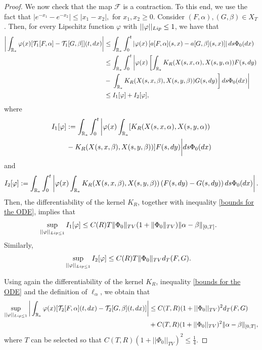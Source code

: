 \documentclass[11pt]{article}
\numberwithin{equation}{section}
\theoremstyle{plain}
\newcommand{\der}{\textup{d}}
\begin{document}
\begin{proof}
We now check that the map $\mathcal F$ is a contraction. 
To this end, we use the fact that $|e^{-x_{1}}-e^{-x_{2}}|\leq|x_{1}-x_{2}|,$ for $x_{1},x_{2}\geq 0.$
Consider $(F,\alpha), (G,\beta) \in X_{T}$. 
Then, for every Lipschitz function $\varphi$ with $||\varphi||_{\textup{Lip}}\leq 1$, we have that
\begin{align*}
\bigg|\int_{\mathbb R_*} \varphi(x) [\mathcal T_1 [F,\alpha ]-\mathcal T_{1}[G,\beta]](t,\der x)\bigg|&\leq \int_{\mathbb R_*} \int_0^t \left| \varphi(x)  \left[a[F,\alpha](s,x)- a[G,\beta ](s,x) \right] \right| \der s \Phi_0(\der x) \\
&\leq \int_{\mathbb R_*} \int_0^t \left| \varphi(x)  \left[ \int_{\mathbb R_*}  K_R(X(s,x,\alpha),X(s,y,\alpha)) F(s, \der y)  \right. \right. \\
& -\left.\left.  \int_{\mathbb R_*}  K_R(X(s,x,\beta),X(s,y,\beta )) G(s, \der y) \right] \der s \Phi_0(\der x)  \right|\\
&\leq I_1[\varphi] + I_2[\varphi],
\end{align*}
where 
\begin{align*}
I_1[\varphi] &:=\int_{\mathbb R_*} \int_0^t \bigg| \varphi(x) \int_{\mathbb R_*} [ K_R(X(s,x,\alpha),X(s,y,\alpha))  \\
&  - K_R(X(s,x,\beta),X(s,y,\beta )) ]  F(s, \der y) \bigg| \der s \Phi_0(\der x)
\end{align*} 
and
\begin{align*} 
I_2[\varphi]:=  \int_{\mathbb R_*} \int_0^t \left| \varphi(x)  \int_{\mathbb R_*}  K_R(X(s,x,\beta),X(s,y,\beta )) \left( F(s, \der y) - G(s, \der y) \right) \der s \Phi_0(\der x ) \right|.
\end{align*} 
Then, the differentiability of the kernel $K_R$, together with inequality \eqref{bounds for the ODE}, implies that 
\begin{align*} 
&\sup_{||\varphi||_{\textup{Lip}\leq 1}} I_1[\varphi] \leq C(R) T \|\Phi_0\|_{TV} (1+ \|\Phi_0\|_{TV}) \|\alpha-\beta\|_{[0,T]}. 
\end{align*} 
Similarly, 
\begin{align*} 
&\sup_{||\varphi||_{\textup{Lip}\leq 1}} I_2[\varphi] \leq C(R) T \|\Phi_0\|_{TV} d_T(F,G). 
\end{align*} 

Using again the differentiability of the kernel $K_R$, inequality \eqref{bounds for the ODE} and the definition of $\ell_\alpha$, we obtain that
\begin{align*}
\sup_{||\varphi||_{\textup{Lip}\leq 1}}  \bigg|\int_{\mathbb R_*}  \varphi(x)[ \mathcal T_2 [F,\alpha](t,\der x)-\mathcal T_{2}[G,\beta](t,\der x)]\bigg| &\leq C(T,R)(1+||\Phi_{0}||_{TV})^{2}  d_T(F,G) \\
&+C(T,R)(1+||\Phi_{0}||_{TV})^{2}   \| \alpha -\beta \|_{[0,T]} ,
\end{align*}
where $T$ can be selected so that $C(T,R)(1+||\Phi_{0}||_{TV})^{2}  \leq \frac{1}{4} $. 
 

\end{proof}
\end{document}
